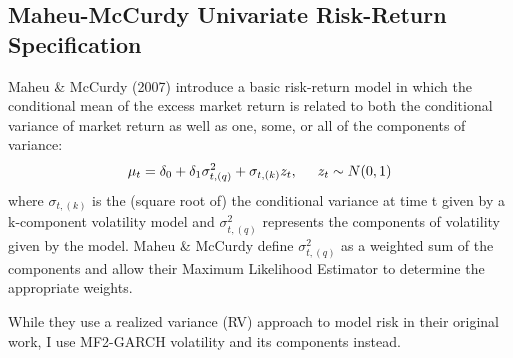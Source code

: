 \documentclass[12pt]{article}
\begin{document}
\subsection{Maheu-McCurdy Univariate Risk-Return Specification}
Maheu \& McCurdy (2007) introduce a basic risk-return model in which the conditional mean of the excess market return is related to both the conditional variance of market return as well as one, some, or all of the components of variance:
\begin{equation}
\mu_t=\delta_0+\delta_1\sigma_{t,(q)}^2+\sigma_{t,(k)}z_t, \hspace{5mm}z_t\sim N(0,1)
\end{equation}
where $\sigma_{t,(k)}$ is the (square root of) the conditional variance at time t given by a k-component volatility model and $\sigma_{t,(q)}^2$ represents the components of volatility given by the model. Maheu \& McCurdy define $\sigma_{t,(q)}^2$ as a weighted sum of the components and allow their Maximum Likelihood Estimator to determine the appropriate weights.\par
While they use a realized variance (RV) approach to model risk in their original work, I use MF2-GARCH volatility and its components instead.
\end{document}
